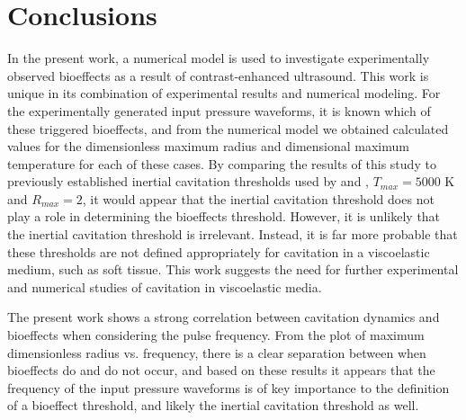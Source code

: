 \clearpage
\pagebreak
\section{Conclusions}
\label{sec:conclusions}

In the present work, a numerical model is used
to investigate experimentally observed bioeffects as a result of
contrast-enhanced ultrasound. This work is unique in its 
combination of experimental results and numerical modeling.
For the experimentally generated input
pressure waveforms, it is known which of these triggered bioeffects,
and from the numerical model we obtained calculated values for
the dimensionless maximum radius and dimensional maximum temperature for each of these cases.  By comparing the
results of this study to previously established inertial cavitation
thresholds used by \cite{Apfel1991} and \cite{Yang2005},
$T_{max}=5000$ K and $R_{max}=2$, it would appear that the inertial
cavitation threshold does not play a role in determining the bioeffects
threshold.  However, it is unlikely that the inertial cavitation
threshold is irrelevant. Instead, it is far more probable that these
thresholds are not defined appropriately for cavitation in a
viscoelastic medium, such as soft tissue. This work suggests the need for
further experimental and numerical studies of cavitation in viscoelastic media.

The present work shows a strong correlation between cavitation dynamics and bioeffects
when considering the pulse frequency.
From the plot of maximum
dimensionless radius vs. frequency, there is a clear separation
between when bioeffects do and do not occur, and based on these
results it appears that the frequency of the input pressure waveforms
is of key importance to the definition of a bioeffect threshold, and
likely the inertial cavitation threshold as well. 

